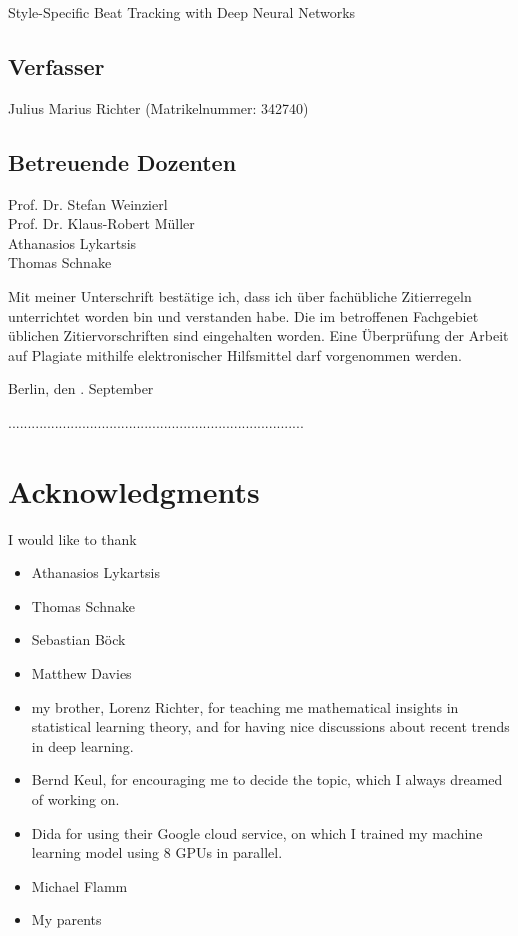 \documentclass{scrartcl}
\begin{document}
Style-Specific Beat Tracking with Deep Neural Networks

\vspace{1em}
\subsection*{Verfasser}

Julius Marius Richter (Matrikelnummer: 342740)

\vspace{1em}
\subsection*{Betreuende Dozenten}

Prof. Dr. Stefan Weinzierl \\
Prof. Dr. Klaus-Robert Müller \\
Athanasios Lykartsis \\
Thomas Schnake 

\vspace{3em}

\noindent Mit meiner Unterschrift bestätige ich, dass ich über fachübliche Zi\-tier\-regeln unterrich\-tet worden bin und verstanden habe. Die im betroffenen Fachgebiet üblichen Zi\-tier\-vorschriften sind eingehalten worden. Eine Überprüfung der Arbeit auf Plagiate mithilfe elektronischer Hilfsmittel darf vorgenommen werden. 

\vspace{4em}
\noindent Berlin, den \the\day. September \the\year

\vspace{3em}
\noindent............................................................................

\newpage 

\section*{Acknowledgments}
I would like to thank
\begin{itemize}
\item Athanasios Lykartsis
\item Thomas Schnake
\item Sebastian Böck
\item Matthew Davies 
\item my brother, Lorenz Richter, for teaching me mathematical insights in statistical learning theory, and for having nice discussions about recent trends in deep learning. 
\item Bernd Keul, for encouraging me to decide the topic, which I always dreamed of working on. 
\item Dida for using their Google cloud service, on which I trained my machine learning model using 8 GPUs in parallel.
\item Michael Flamm
\item My parents 
\end{itemize}
\end{document}
